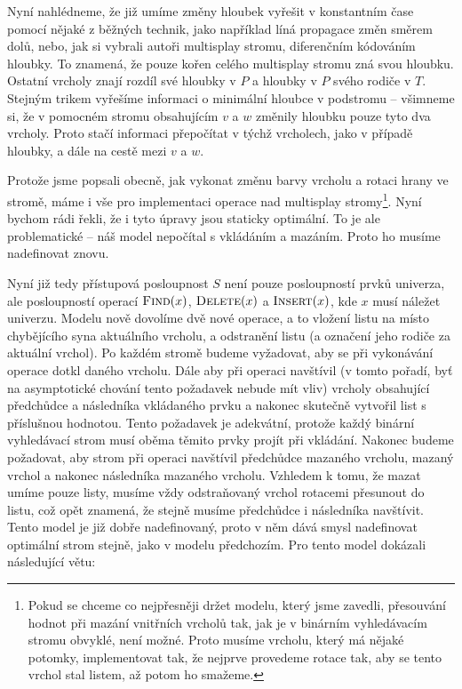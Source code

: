 Nyní nahlédneme, že již umíme změny hloubek vyřešit v konstantním čase pomocí nějaké
z běžných technik, jako například líná propagace změn směrem dolů, nebo, jak si
vybrali autoři multisplay stromu, diferenčním kódováním hloubky. To znamená, že
pouze kořen celého multisplay stromu zná svou hloubku. Ostatní vrcholy znají
rozdíl své hloubky v $P$ a hloubky v $P$ svého rodiče v $T$. Stejným trikem
vyřešíme informaci o minimální hloubce v podstromu -- všimneme si, že v
pomocném stromu obsahujícím $v$ a $w$ změnily hloubku pouze tyto dva vrcholy.
Proto stačí informaci přepočítat v týchž vrcholech, jako v případě hloubky, a
dále na cestě mezi $v$ a $w$.

Protože jsme popsali obecně, jak vykonat změnu barvy vrcholu a rotaci hrany ve stromě, máme i vše pro implementaci operace  nad multisplay stromy\footnote{Pokud se chceme co nejpřesněji držet modelu, který jsme zavedli, přesouvání hodnot při mazání vnitřních vrcholů tak, jak je v binárním vyhledávacím stromu obvyklé, není možné. Proto musíme  vrcholu, který má nějaké potomky, implementovat tak, že nejprve provedeme rotace tak, aby se tento vrchol stal listem, až potom ho smažeme.}. Nyní bychom rádi řekli, že i tyto úpravy jsou staticky optimální. To je ale problematické -- náš model nepočítal s vkládáním a mazáním. Proto ho musíme nadefinovat znovu.

Nyní již tedy přístupová posloupnost $S$ není pouze posloupností prvků
univerza, ale posloupností operací $\ope{Find}(x)$, $\ope{Delete}(x)$ a
$\ope{Insert}(x)$, kde $x$ musí náležet univerzu. Modelu nově dovolíme dvě
nové operace, a to vložení listu na místo chybějícího syna aktuálního vrcholu,
a odstranění listu (a označení jeho rodiče za aktuální vrchol). Po každém
stromě budeme vyžadovat, aby se při vykonávání operace  dotkl daného
vrcholu. Dále aby při operaci  navštívil (v tomto pořadí, byť na
asymptotické chování tento požadavek nebude mít vliv) vrcholy obsahující
předchůdce a následníka vkládaného prvku a nakonec skutečně vytvořil list s
příslušnou hodnotou. Tento požadavek je adekvátní, protože každý binární
vyhledávací strom musí oběma těmito prvky projít při vkládání. Nakonec budeme
požadovat, aby strom při operaci  navštívil předchůdce mazaného
vrcholu, mazaný vrchol a nakonec následníka mazaného vrcholu. Vzhledem k tomu,
že mazat umíme pouze listy, musíme vždy odstraňovaný vrchol rotacemi přesunout
do listu, což opět znamená, že stejně musíme předchůdce i následníka navštívit.
Tento model je již dobře nadefinovaný, proto v něm dává smysl nadefinovat optimální strom stejně, jako v modelu předchozím.
Pro tento model \citet{multisplay} dokázali následující větu:

